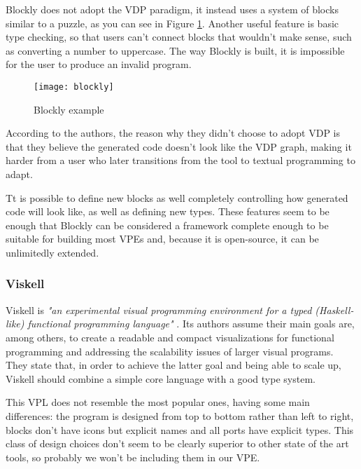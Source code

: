 Blockly does not adopt the VDP paradigm, it instead uses a system of blocks
similar to a puzzle, as you can see in Figure \ref{fig:blockly}.
Another useful feature is basic type checking,
so that users can't connect blocks that wouldn't make sense, such as converting
a number to uppercase. The way Blockly is built, it is impossible for the user
to produce an invalid program.

\begin{figure}[t]
  \begin{center}
    \leavevmode
    \texttt{[image: blockly]}
    \caption{Blockly example \cite{blockly}}
    \label{fig:blockly}
  \end{center}
\end{figure}

According to the authors, the reason why they didn't choose to adopt VDP is that
they believe the generated code doesn't look like the VDP graph, making it harder
from a user who later transitions from the tool to textual programming to adapt.

Tt is possible to define new blocks as well completely controlling
how generated code will look like, as well as defining new types. These features
seem to be enough that Blockly can be considered a framework complete enough to
be suitable for building most VPEs and, because it is open-source, it can be
unlimitedly extended.

\subsubsection{Viskell}
\label{sec:viskell}

Viskell is \textit{"an experimental visual programming environment for a typed
(Haskell-like) functional programming language"} \cite{viskell}. Its authors
assume their main goals are, among others, to create a readable and compact
visualizations for functional programming and addressing the scalability issues
of larger visual programs. They state that, in order to achieve the latter goal
and being able to scale up, Viskell should combine a simple core language with
a good type system.

This VPL does not resemble the most popular ones, having some main differences:
the program is designed from top to bottom rather than left to right, blocks
don't have icons but explicit names and all ports have explicit types. This class
of design choices don't seem to be clearly superior to other state of the art tools,
so probably we won't be including them in our VPE.

